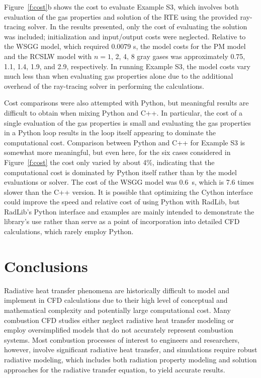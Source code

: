 \documentclass[preprint,12pt]{elsarticle}
\begin{document}
Figure~\ref{f:cost}b shows the cost to evaluate Example S3, which involves both evaluation of the gas properties and solution of the RTE using the provided ray-tracing solver. In the results presented, only the cost of evaluating the solution was included; initialization and input/output costs were neglected.
Relative to the WSGG model, which required 0.0079 s, the model costs for the PM model and the RCSLW model with $n=1$, 2, 4, 8 gray gases was approximately 0.75, 1.1, 1.4, 1.9, and 2.9, respectively. In running Example S3, the model costs vary much less than when evaluating gas properties alone due to the additional overhead of the ray-tracing solver in performing the calculations. 

Cost comparisons were also attempted with Python, but  meaningful results are difficult to obtain when mixing Python and C++. In particular, the cost of a single evaluation of the gas properties is small and evaluating the gas properties in a Python loop results in the loop itself appearing to dominate the computational cost. Comparison between Python and C++ for Example S3 is somewhat more meaningful, but even here, for the six cases considered in Figure~\ref{f:cost} the cost only varied by about 4\%, indicating that the computational cost is dominated by Python itself rather than by the model evaluations or solver. The cost of the WSGG model was 0.6~s, which is 7.6 times slower than the C++ version. It is possible that optimizing the Cython interface could improve the speed and relative cost of using Python with RadLib, but RadLib's Python interface and examples are mainly intended to demonstrate the library's use rather than serve as a point of incorporation into detailed CFD calculations, which rarely employ Python.


\section{Conclusions} \label{s:conclusions}

Radiative heat transfer phenomena are historically difficult to model and implement in CFD calculations due to their high level of conceptual and mathematical complexity and potentially large computational cost. Many combustion CFD studies either neglect radiative heat transfer modeling or employ oversimplified models that do not accurately represent combustion systems. Most combustion processes of interest to engineers and researchers, however, involve significant radiative heat transfer, and simulations require robust radiative modeling, which includes both radiation property modeling and solution approaches for the radiative transfer equation, to yield accurate results. 
\end{document}
